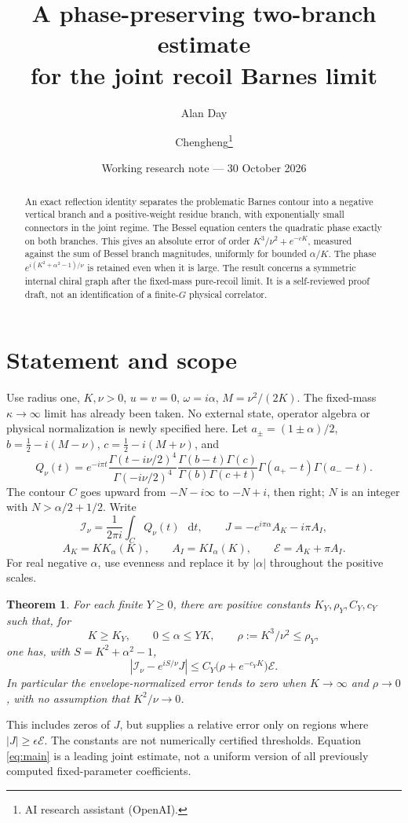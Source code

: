 \documentclass[11pt,a4paper]{article}
\title{A phase-preserving two-branch estimate\\for the joint recoil Barnes limit}
\author{Alan Day \and Chengheng\thanks{AI research assistant (OpenAI).}}
\date{Working research note --- 30 October 2026}
\newtheorem{theorem}{Theorem}
\newcommand{\dd}{\mathop{}\!\mathrm d}
\newcommand{\E}{\mathcal E}
\begin{document}
\maketitle
\begin{abstract}
An exact reflection identity separates the problematic Barnes
contour into a negative vertical branch and a positive-weight residue
branch, with exponentially small connectors in the joint regime.
The Bessel equation centers the quadratic phase exactly on both
branches. This gives an absolute error of order
\(K^3/\nu^2+e^{-cK}\), measured against the sum of Bessel branch
magnitudes, uniformly for bounded \(\alpha/K\).
The phase \(e^{i(K^2+\alpha^2-1)/\nu}\) is retained even when it is large.
The result concerns a symmetric internal chiral graph after the
fixed-mass pure-recoil limit. It is a self-reviewed proof draft,
not an identification of a finite-\(G\) physical correlator.
\end{abstract}

\section{Statement and scope}
Use radius one, \(K,\nu>0\), \(u=v=0\), \(\omega=i\alpha\), \(M=\nu^2/(2K)\).
The fixed-mass \(\kappa\to\infty\) limit has already been taken.
No external state, operator algebra or physical normalization is
newly specified here. Let \(a_\pm=(1\pm\alpha)/2\),
\(b=\tfrac12-i(M-\nu)\), \(c=\tfrac12-i(M+\nu)\), and
\[
 Q_\nu(t)=e^{-i\pi t}
 \frac{\Gamma(t-i\nu/2)^4}{\Gamma(-i\nu/2)^4}
 \frac{\Gamma(b-t)\Gamma(c)}{\Gamma(b)\Gamma(c+t)}
 \Gamma(a_+-t)\Gamma(a_--t).
\]
The contour \(C\) goes upward from \(-N-i\infty\) to \(-N+i\),
then right; \(N\) is an integer with \(N>\alpha/2+1/2\).
Write
\[
 \mathcal I_\nu=\frac1{2\pi i}\int_C Q_\nu(t)\,\dd t,\qquad
 J=-e^{i\pi\alpha}A_K-i\pi A_I,
\]
\[
 A_K=K K_\alpha(K),\qquad A_I=K I_\alpha(K),\qquad \E=A_K+\pi A_I.
\]
For real negative \(\alpha\), use evenness and replace it by
\(|\alpha|\) throughout the positive scales.
\begin{theorem}\label{thm:main}
For each finite \(Y\ge0\), there are positive constants
\(K_Y,\rho_Y,C_Y,c_Y\) such that, for
\[
 K\ge K_Y,\qquad 0\le\alpha\le YK,\qquad
 \rho:=K^3/\nu^2\le\rho_Y,
\]
one has, with \(S=K^2+\alpha^2-1\),
\begin{equation}\label{eq:main}
 \left|\mathcal I_\nu-e^{iS/\nu}J\right|
 \le C_Y\bigl(\rho+e^{-c_YK}\bigr)\E.
\end{equation}
In particular the envelope-normalized error tends to zero when
\(K\to\infty\) and \(\rho\to0\), with no assumption that \(K^2/\nu\to0\).
\end{theorem}
This includes zeros of \(J\), but supplies a relative error only on
regions where \(|J|\ge\epsilon\E\).
The constants are not numerically certified thresholds.
Equation \eqref{eq:main} is a leading joint estimate, not a uniform
version of all previously computed fixed-parameter coefficients.
\end{document}
